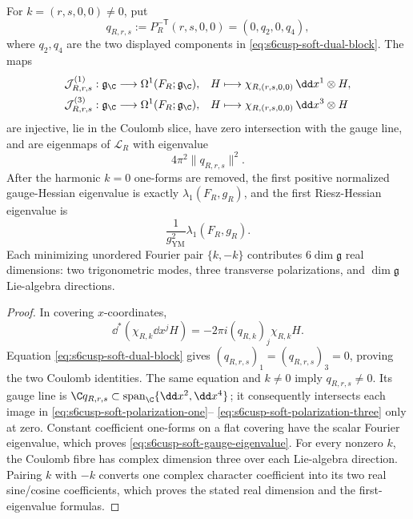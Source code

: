 \begin{corollary}
\label{cor:s6cusp-explicit-physical-soft-modes}
For \(k=(r,s,0,0)\ne0\), put
\[
 q_{R,r,s}:=P_R^{-\mathsf T}(r,s,0,0)
 =(0,q_2,0,q_4),
\]
where \(q_2,q_4\) are the two displayed components in
\eqref{eq:s6cusp-soft-dual-block}.  The maps
\begin{align}
 \mathcal J^{(1)}_{R,r,s}:\mathfrak g_{\C}
 &\longrightarrow\Omega^1(F_R;\mathfrak g_{\C}),
 &H&\longmapsto\chi_{R,(r,s,0,0)}\,\dd x^1\otimes H,
 \label{eq:s6cusp-soft-polarization-one}\\
 \mathcal J^{(3)}_{R,r,s}:\mathfrak g_{\C}
 &\longrightarrow\Omega^1(F_R;\mathfrak g_{\C}),
 &H&\longmapsto\chi_{R,(r,s,0,0)}\,\dd x^3\otimes H
 \label{eq:s6cusp-soft-polarization-three}
\end{align}
are injective, lie in the Coulomb slice, have zero intersection with the
gauge line, and are eigenmaps of \(\mathcal L_R\) with eigenvalue
\begin{equation}\label{eq:s6cusp-soft-gauge-eigenvalue}
 4\pi^2\lVert q_{R,r,s}\rVert^2.
\end{equation}
After the harmonic \(k=0\) one-forms are removed, the first positive
normalized gauge-Hessian eigenvalue is exactly
\(\lambda_1(F_R,g_R)\), and the first Riesz-Hessian eigenvalue is
\[
 \frac1{g_{\mathrm{YM}}^2}\lambda_1(F_R,g_R).
\]
Each minimizing unordered Fourier pair \(\{k,-k\}\) contributes
\(6\dim\mathfrak g\) real dimensions: two trigonometric modes, three
transverse polarizations, and \(\dim\mathfrak g\) Lie-algebra directions.
\end{corollary}

\begin{proof}
In covering \(x\)-coordinates,
\[
 \dd^*(\chi_{R,k}\dd x^jH)
 =-2\pi i(q_{R,k})_j\chi_{R,k}H.
\]
Equation \eqref{eq:s6cusp-soft-dual-block} gives
\((q_{R,r,s})_1=(q_{R,r,s})_3=0\), proving the two Coulomb identities.
The same equation and \(k\ne0\) imply \(q_{R,r,s}\ne0\).  Its gauge line
is \(\C q_{R,r,s}\subset\operatorname{span}_{\C}\{\dd x^2,\dd x^4\}\);
it consequently intersects each image in
\eqref{eq:s6cusp-soft-polarization-one}--
\eqref{eq:s6cusp-soft-polarization-three} only at zero.  Constant
coefficient one-forms on a flat covering have the scalar Fourier
eigenvalue, which proves \eqref{eq:s6cusp-soft-gauge-eigenvalue}.
For every nonzero \(k\), the Coulomb fibre has complex dimension three
over each Lie-algebra direction.  Pairing \(k\) with \(-k\) converts one
complex character coefficient into its two real sine/cosine coefficients,
which proves the stated real dimension and the first-eigenvalue formulas.
\end{proof}

